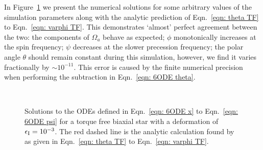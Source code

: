 \documentclass[../full_thesis/full_thesis.tex]{subfiles}
\begin{document}
In Figure~\ref{fig: biaxial body no torque} we present the numerical solutions
for some arbitrary values of the simulation parameters along with the analytic
prediction of Eqn.~\eqref{eqn: theta TF} to Eqn.~\eqref{eqn: varphi TF}. This
demonstrates `almost' perfect agreement between the two: the components of
$\Omega_a$ behave as expected;
$\phi$ monotonically increases at the spin frequency; $\psi$ decreases at the
slower precession frequency; the polar angle $\theta$ should remain constant
during this simulation, however, we find it varies fractionally by $\sim
10^{-11}$.  This error is caused by the finite numerical precision when
performing the subtraction in Eqn.~\eqref{eqn: 6ODE theta}.
\afterpage{\clearpage}
\begin{figure}[p]
    \centering
{} \\
\caption{Solutions to the ODEs defined in Eqn.~\eqref{eqn: 6ODE x} to
Eqn.~\eqref{eqn: 6ODE psi} for a
torque free biaxial star with a deformation of $\epsilon_{\mathrm{I}} = 10^{-3}$. The red
dashed line is the analytic calculation found by \citet{Jones2001}
as given in Eqn.~\eqref{eqn: theta TF} to Eqn.~\eqref{eqn: varphi TF}.}
\label{fig: biaxial body no torque}
\end{figure}
\end{document}
